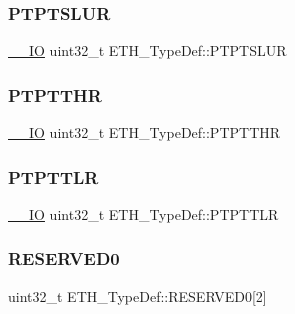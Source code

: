 \mbox{\label{struct_e_t_h___type_def_a0b388c052998631c58d82536ecf3c560}} 
\subsubsection{\texorpdfstring{PTPTSLUR}{PTPTSLUR}}
{\footnotesize\ttfamily \mbox{\hyperlink{group___c_m_s_i_s___c_m3__core__definitions_gaec43007d9998a0a0e01faede4133d6be}{\+\_\+\+\_\+\+IO}} uint32\+\_\+t E\+T\+H\+\_\+\+Type\+Def\+::\+P\+T\+P\+T\+S\+L\+UR}

\mbox{\label{struct_e_t_h___type_def_a10ebf9b64b96114e8bc16bf03d24a4b2}} 
\subsubsection{\texorpdfstring{PTPTTHR}{PTPTTHR}}
{\footnotesize\ttfamily \mbox{\hyperlink{group___c_m_s_i_s___c_m3__core__definitions_gaec43007d9998a0a0e01faede4133d6be}{\+\_\+\+\_\+\+IO}} uint32\+\_\+t E\+T\+H\+\_\+\+Type\+Def\+::\+P\+T\+P\+T\+T\+HR}

\mbox{\label{struct_e_t_h___type_def_a018a92d638dd4bd98b1640c8dae2a289}} 
\subsubsection{\texorpdfstring{PTPTTLR}{PTPTTLR}}
{\footnotesize\ttfamily \mbox{\hyperlink{group___c_m_s_i_s___c_m3__core__definitions_gaec43007d9998a0a0e01faede4133d6be}{\+\_\+\+\_\+\+IO}} uint32\+\_\+t E\+T\+H\+\_\+\+Type\+Def\+::\+P\+T\+P\+T\+T\+LR}

\mbox{\label{struct_e_t_h___type_def_a77b23b4cce3105e15265164ed009c25e}} 
\subsubsection{\texorpdfstring{RESERVED0}{RESERVED0}}
{\footnotesize\ttfamily uint32\+\_\+t E\+T\+H\+\_\+\+Type\+Def\+::\+R\+E\+S\+E\+R\+V\+E\+D0\mbox{[}2\mbox{]}}

